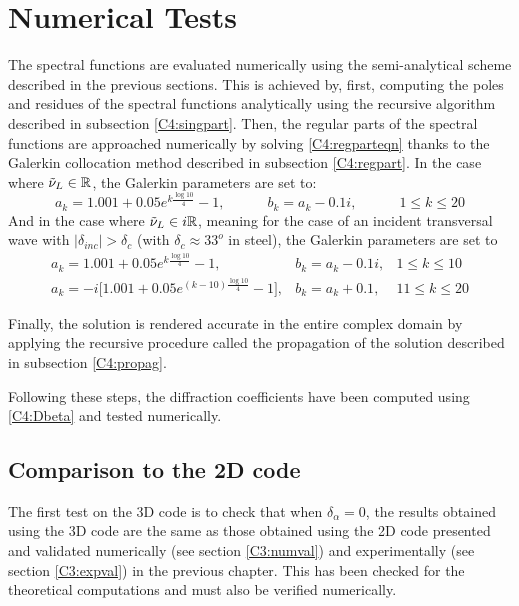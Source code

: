 \section{Numerical Tests}
The spectral functions are evaluated numerically using the semi-analytical scheme described in the previous sections. This is achieved by, first, computing the poles and residues of the spectral functions analytically using the recursive algorithm described in subsection \ref{C4:singpart}. Then, the regular parts of the spectral functions are approached numerically by solving \eqref{C4:regparteqn} thanks to the Galerkin collocation method described in subsection \ref{C4:regpart}. In the case where $\tilde{\nu}_L \in \mathbb{R}$, the Galerkin parameters are set to:
\begin{equation}
a_k=1.001+0.05e^{k\frac{\log 10}{4}}-1, \hspace{3em} b_k=a_k-0.1i, \hspace{3em} 1\leq k\leq20
\end{equation}
And in the case where $\tilde{\nu}_L \in i\mathbb{R}$, meaning for the case of an incident transversal wave with $|\delta_{inc}|>\delta_c$ (with $\delta_c \approx 33^o$ in steel), the Galerkin parameters are set to
\begin{equation}
\begin{matrix}
a_k=1.001+0.05e^{k\frac{\log 10}{4}}-1, & b_k=a_k-0.1i, & 1\leq k\leq10\\
a_k=-i\lbrack 1.001+0.05e^{(k-10)\frac{\log 10}{4}}-1\rbrack, & b_k=a_k+0.1, & 11\leq k\leq20
\end{matrix}
\end{equation}

Finally, the solution is rendered accurate in the entire complex domain by applying the recursive procedure called the propagation of the solution described in subsection \ref{C4:propag}.

Following these steps, the diffraction coefficients have been computed using \eqref{C4:Dbeta} and tested numerically.

\subsection{Comparison to the 2D code}
The first test on the 3D code is to check that when $\delta_{\alpha}=0$, the results obtained using the 3D code are the same as those obtained using the 2D code presented and validated numerically (see section \ref{C3:numval}) and experimentally (see section \ref{C3:expval}) in the previous chapter. This has been checked for the theoretical computations and must also be verified numerically.

